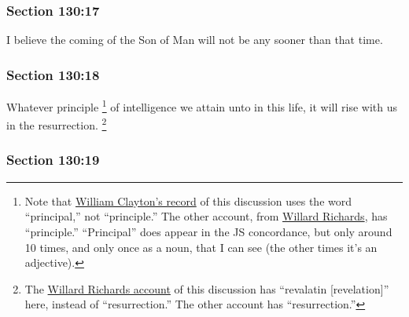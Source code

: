 	\subsubsection{Section 130:17} %
		\label{DC130-17}

		I believe the coming of the Son of Man will not be any sooner than that time.


	\subsubsection{Section 130:18} %
		\label{DC130-18}

		Whatever principle%
			\footnote{%
				Note that \hyperref[EMS-1843-JS-2-APR-1843-WC]{William Clayton's record} of this discussion uses the word ``principal,'' not ``principle.'' The other account, from \hyperref[EMS-1843-JS-2-APR-1843-WR]{Willard Richards}, has ``principle.'' ``Principal'' does appear in the JS concordance, but only around 10 times, and only once as a noun, that I can see (the other times it's an adjective).
				}
		of intelligence we attain unto in this life, it will rise with us in the resurrection.%
			\footnote{%
				The \hyperref[EMS-1843-JS-2-APR-1843-WR]{Willard Richards account} of this discussion has ``revalatin [revelation]'' here, instead of ``resurrection.'' The other account has ``resurrection.''
				}


	\subsubsection{Section 130:19} %
		\label{DC130-19}

